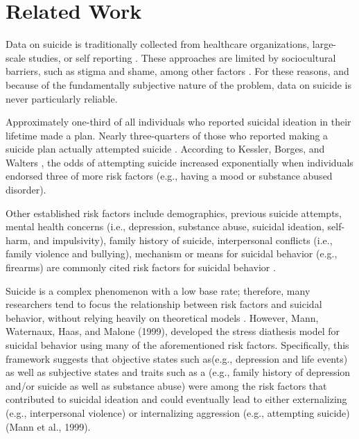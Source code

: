 \documentclass[11pt]{article}
\begin{document}
\section{Related Work}
Data on suicide is traditionally collected from healthcare organizations, large-scale studies, or self reporting \cite{crosby2011self,horowitz2009suicide}. These approaches are limited by sociocultural barriers, such as stigma and shame, among other factors \cite{crosby2011self}. For these reasons, and because of the fundamentally subjective nature of the problem, data on suicide is never particularly reliable. 

Approximately one-third of all individuals who reported suicidal ideation in their lifetime made a plan. Nearly three-quarters of those who reported making a suicide plan actually attempted suicide \cite{kessler1999prevalence}. According to Kessler, Borges, and Walters  \cite{kessler1999prevalence}, the odds of attempting suicide increased exponentially when individuals endorsed three of more risk factors (e.g., having a mood or substance abused disorder). 

Other established risk factors include demographics, previous suicide attempts, mental health concerns (i.e., depression, substance abuse, suicidal ideation, self-harm, and impulsivity), family history of suicide, interpersonal conflicts (i.e., family violence and bullying), mechanism or means for suicidal behavior (e.g., firearms)  are commonly cited risk factors for suicidal behavior \cite{nock2008suicide,crosby2011self,gaynes2004screening,harriss2005suicidal,shaffer2004columbia,shaffer2004columbia,brown2000risk}. 

Suicide is a complex phenomenon with a low base rate; therefore, many researchers tend to focus the relationship between risk factors and suicidal behavior, without relying heavily on theoretical models \cite{nock2008suicide}. However, Mann, Waternaux, Haas, and Malone (1999), developed the stress diathesis model for suicidal behavior using many of the aforementioned risk factors.  Specifically, this framework suggests that objective states such as(e.g.,  depression and life events) as well as subjective states and traits such as a (e.g., family history of depression and/or suicide as well as substance abuse) were among the risk factors that contributed to suicidal ideation and could eventually lead to either externalizing (e.g., interpersonal violence) or internalizing aggression (e.g., attempting suicide) (Mann et al., 1999).
\end{document}
